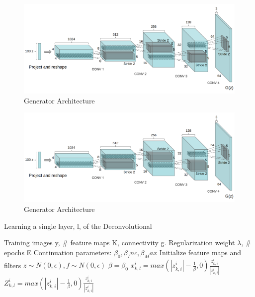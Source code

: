 \begin{figure}
  \centering
    \includegraphics[scale=.7, angle=0]{Files/Generator-Architecture.png}
    \caption[Generator Architecture]{Generator Architecture\cite{DCGAN}}
    \label{fig: Simple-Conv}
\end{figure}

\begin{figure}
  \centering
    \includegraphics[scale=.7, angle=0]{Files/Generator-Architecture.png}
    \caption[Generator Architecture]{Generator Architecture\cite{DCGAN}}
    \label{fig: DCGAN}
\end{figure}
\begin{algorithm}[ht]
\caption{Learning a single layer, l, of the Deconvolutional\cite{Deconv}}
\label{alg:algorithm1}

\begin{algorithmic}[1]
\Require
    \Statex Training images y, \# feature maps K, connectivity g. \Statex Regularization weight $\lambda$, \# epochs E
    \Statex Continuation parameters: $\beta_0, \beta_Inc,\beta_Max $
\State Initialize feature maps and filters $z \sim N (0, \epsilon), f \sim N (0, \epsilon)$
        \State$\beta=\beta_0$
        \State $x^{i}_{k,l}= max(\left | z^{i}_{k,i} \right |-\frac{1}{\beta} ,0)\frac{z^{i}_{k,i}}{\left | z^{i}_{k,i} \right|}$
        \State $Z^{i}_{k,l}= max(\left | z^{i}_{k,i} \right |-\frac{1}{\beta} ,0)\frac{z^{i}_{k,i}}{\left | z^{i}_{k,i} \right|}$
        \EndWhile
    \EndFor
\EndFor
\end{algorithmic}
\end{algorithm}
